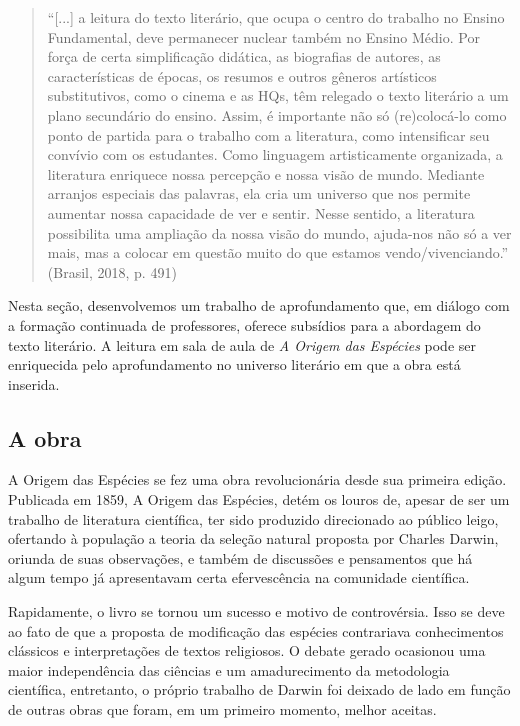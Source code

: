 \documentclass[12pt]{extarticle}
\begin{document}
\begin{quotation} ``{[}...{]} a leitura do texto literário, que ocupa o centro
  do trabalho no Ensino Fundamental, deve permanecer nuclear também no Ensino
  Médio.  Por força de certa simplificação didática, as biografias de autores,
  as características de épocas, os resumos e outros gêneros artísticos
  substitutivos, como o cinema e as HQs, têm relegado o texto literário a um
  plano secundário do ensino. Assim, é importante não só (re)colocá-lo como
  ponto de partida para o trabalho com a literatura, como intensificar seu
  convívio com os estudantes. Como linguagem artisticamente organizada,
  a literatura enriquece nossa percepção e nossa visão de mundo. Mediante
  arranjos especiais das palavras, ela cria um universo que nos permite
  aumentar nossa capacidade de ver e sentir.  Nesse sentido, a literatura
  possibilita uma ampliação da nossa visão do mundo, ajuda-nos não só a ver
  mais, mas a colocar em questão muito do que estamos vendo/vivenciando.''
(Brasil, 2018, p. 491) \end{quotation}

Nesta seção, desenvolvemos um trabalho de aprofundamento que, em diálogo com
a formação continuada de professores, oferece subsídios para a abordagem do
texto literário. A leitura em sala de aula de \emph{A Origem das Espécies} pode
ser enriquecida pelo aprofundamento no universo literário em que a obra está
inserida.

\subsection{A obra}

A Origem das Espécies se fez uma obra revolucionária desde sua primeira edição.
Publicada em 1859, A Origem das Espécies, detém os louros de, apesar de ser um
trabalho de literatura científica, ter sido produzido direcionado ao público
leigo, ofertando à população a teoria da seleção natural proposta por Charles
Darwin, oriunda de suas observações, e também de discussões e pensamentos que
há algum tempo já apresentavam certa efervescência na comunidade científica.

Rapidamente, o livro se tornou um sucesso e motivo de controvérsia. Isso se
deve ao fato de que a proposta de modificação das espécies contrariava
conhecimentos clássicos e interpretações de textos religiosos. O debate gerado
ocasionou uma maior independência das ciências e um amadurecimento da
metodologia científica, entretanto, o próprio trabalho de Darwin foi deixado de
lado em função de outras obras que foram, em um primeiro momento, melhor
aceitas.
\end{document}
